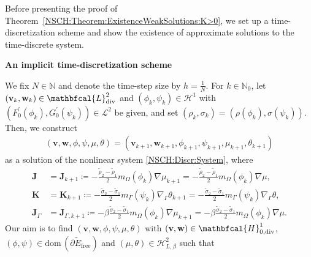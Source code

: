 \documentclass[11pt,reqno]{amsart}
\theoremstyle{remark}
\numberwithin{equation}{section}
\newcommand{\N}{\mathbb N}
\newcommand{\Grad}{\nabla}
\newcommand{\Div}{\textnormal{div}}
\newcommand{\Gradg}{\nabla_\Ga}
\newcommand{\Om}{\Omega}
\newcommand{\Ga}{\Gamma}
\newcommand{\J}{\mathbf J}
\newcommand{\K}{\mathbf K}
\newcommand{\bv}{\mathbf v}
\newcommand{\bw}{\mathbf w}
\newcommand{\free}{\mathrm{free}}
\begin{document}
Before presenting the proof of Theorem~\ref{NSCH:Theorem:ExistenceWeakSolutions:K>0}, we set up a time-discretization scheme and show the existence of approximate solutions to the time-discrete system.

\noindent
\textbf{An implicit time-discretization scheme}

We fix $N\in\N$ and denote the time-step size by $h = \frac1N$. For $k\in\N_0$, let $(\bv_k,\bw_k)\in\mathbfcal{L}^2_\Div$ and $(\phi_k,\psi_k)\in\mathcal{H}^1$ with $(F_0^\prime(\phi_k),G_0^\prime(\psi_k))\in\mathcal{L}^2$ be given, and set $(\rho_k,\sigma_k) = (\rho(\phi_k),\sigma(\psi_k))$. Then, we construct 
\begin{align*}
	(\bv,\bw,\phi,\psi,\mu,\theta) = (\bv_{k+1},\bw_{k+1},\phi_{k+1},\psi_{k+1},\mu_{k+1},\theta_{k+1})
\end{align*}
as a solution of the nonlinear system \eqref{NSCH:Discr:System}, where
\begin{align*}
    \J &= \J_{k+1} \coloneqq -\frac{\tilde\rho_2-\tilde\rho_1}{2}m_\Om(\phi_k)\Grad\mu_{k+1} = -\frac{\tilde\rho_2-\tilde\rho_1}{2}m_\Om(\phi_k)\Grad\mu, \\
    \K &= \K_{k+1} \coloneqq -\frac{\tilde\sigma_2-\tilde\sigma_1}{2}m_\Ga(\psi_k)\Gradg\theta_{k+1} = -\frac{\tilde\sigma_2-\tilde\sigma_1}{2}m_\Ga(\psi_k)\Gradg\theta, \\
    \J_\Ga &= \J_{\Ga,k+1} \coloneqq -\beta\frac{\tilde\sigma_2-\tilde\sigma_1}{2}m_\Om(\phi_k)\Grad\mu_{k+1} = -\beta\frac{\tilde\sigma_2-\tilde\sigma_1}{2}m_\Om(\phi_k)\Grad\mu.
\end{align*}
Our aim is to find $(\bv,\bw,\phi,\psi,\mu,\theta)$ with $(\bv,\bw)\in\mathbfcal{H}^1_{0,\Div}$, $(\phi,\psi)\in\mathrm{dom}\,(\partial\widetilde E_\free)$ and $(\mu,\theta)\in\mathcal{H}^2_{L,\beta}$ such that
\end{document}
